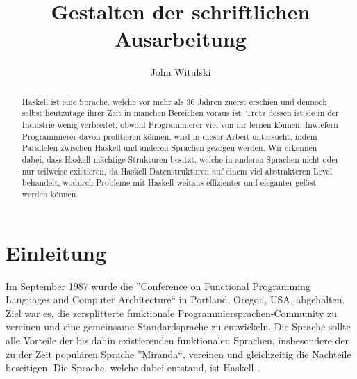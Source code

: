 \documentclass{hhuarticle}
\title{Gestalten der schriftlichen Ausarbeitung}
\author{John Witulski} %
\theoremstyle{definition}
\theoremstyle{theorem}
\begin{document}
  \maketitle

  \begin{abstract}
    Haskell ist eine Sprache, welche vor mehr als 30 Jahren zuerst erschien
    und dennoch selbst heutzutage ihrer Zeit in manchen Bereichen voraus ist.
    Trotz dessen ist sie in der Industrie wenig verbreitet, obwohl
    Programmierer viel von ihr lernen können.
    Inwiefern Programmierer davon profitieren können,
    wird in dieser Arbeit untersucht, indem
    Parallelen zwischen Haskell und anderen Sprachen gezogen werden.
    Wir erkennen dabei, dass Haskell mächtige Strukturen besitzt, welche
    in anderen Sprachen nicht oder nur teilweise existieren, da Haskell
    Datenstrukturen auf einem viel abstrakteren Level behandelt,
    wodurch Probleme mit Haskell weitaus effizienter und eleganter
    gelöst werden können.
  \end{abstract}

\tableofcontents


  \section{Einleitung}

  Im September 1987 wurde die
  ''Conference on Functional Programming Languages and Computer Architecture``
  in Portland, Oregon, USA, abgehalten. Ziel war es, die zersplitterte
  funktionale Programmiersprachen-Community zu vereinen und eine
  gemeinsame Standardsprache zu entwickeln.
  Die Sprache sollte alle Vorteile der bis dahin existierenden
  funktionalen Sprachen, insbesondere der zu der Zeit populären Sprache
  ''Miranda``, vereinen und gleichzeitig die Nachteile beseitigen.
  Die Sprache, welche dabei entstand, ist Haskell \cite{haskellHistory}.
\end{document}
